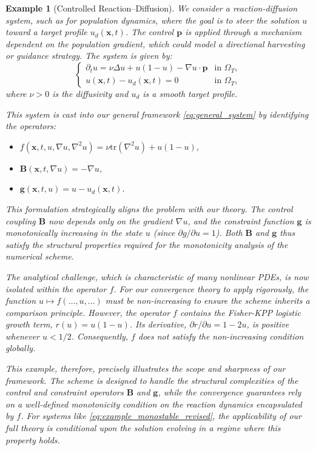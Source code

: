 \documentclass[pdflatex,sn-mathphys-num]{sn-jnl}%
\theoremstyle{thmstyleone}%
\newtheorem{ex}{Example}[section]
\numberwithin{equation}{section}
\begin{document}
\begin{ex}[Controlled Reaction--Diffusion]
\label{ex:controlled_reaction_diffusion}
We consider a reaction-diffusion system, such as for population dynamics, where the goal is to steer the solution $u$ toward a target profile $u_d(\bm{x}, t)$. The control $\bm p$ is applied through a mechanism dependent on the population gradient, which could model a directional harvesting or guidance strategy. The system is given by:
\begin{equation}
\label{eq:example_monostable_revised}
\begin{cases}
\partial_t u = \nu \Delta u + u(1-u) - \nabla u \cdot \bm p & \text{in } \Omega_T, \\
u(\bm{x}, t) - u_d(\bm{x}, t) = 0 & \text{in } \Omega_T,
\end{cases}
\end{equation}
where $\nu > 0$ is the diffusivity and $u_d$ is a smooth target profile.

This system is cast into our general framework \eqref{eq:general_system} by identifying the operators:
\begin{itemize}
    \item \( f(\bm{x}, t, u, \nabla u, \nabla^2 u) = \nu \text{tr}(\nabla^2 u) + u(1-u) \),
    \item \( \bm{B}(\bm{x}, t, \nabla u) = -\nabla u \),
    \item \( \bm{g}(\bm{x}, t, u) = u - u_d(\bm{x},t) \).
\end{itemize}
This formulation strategically aligns the problem with our theory. The control coupling $\bm{B}$ now depends only on the gradient $\nabla u$, and the constraint function $\bm{g}$ is monotonically increasing in the state $u$ (since $\partial g / \partial u = 1$). Both $\bm{B}$ and $\bm{g}$ thus satisfy the structural properties required for the monotonicity analysis of the numerical scheme.

The analytical challenge, which is characteristic of many nonlinear PDEs, is now isolated within the operator $f$. For our convergence theory to apply rigorously, the function $u \mapsto f(\dots, u, \dots)$ must be non-increasing to ensure the scheme inherits a comparison principle. However, the operator $f$ contains the Fisher-KPP logistic growth term, $r(u) = u(1-u)$. Its derivative, $\partial r / \partial u = 1 - 2u$, is positive whenever $u < 1/2$. Consequently, $f$ does not satisfy the non-increasing condition globally.

This example, therefore, precisely illustrates the scope and sharpness of our framework. The scheme is designed to handle the structural complexities of the control and constraint operators $\bm{B}$ and $\bm{g}$, while the convergence guarantees rely on a well-defined monotonicity condition on the reaction dynamics encapsulated by $f$. For systems like \eqref{eq:example_monostable_revised}, the applicability of our full theory is conditional upon the solution evolving in a regime where this property holds.
\end{ex}
\end{document}
